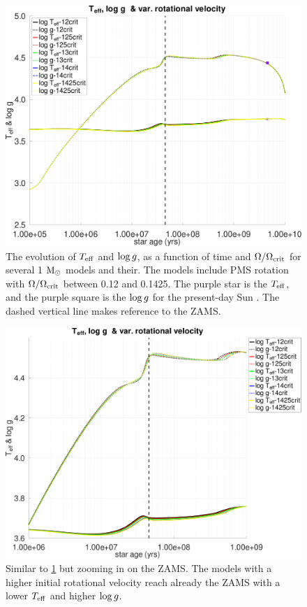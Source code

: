 \documentclass[fleqn,usenatbib]{mnras}
\begin{document}
\begin{ceqn}
\begin{figure}
	\includegraphics[clip,width=\columnwidth]{figures/paper2/teff_logg_var_vel_g3.pdf}
    \caption{The evolution of $T_{\mathrm{eff}}$ and $\mathrm{log} \, g$, as a function of time and $\Omega / \Omega_{\mathrm{crit}}$ for several 1 $\mathrm{M}_\odot$ models and their. The models include PMS rotation with $\Omega / \Omega_{\mathrm{crit}}$ between 0.12 and 0.1425. The purple star is the $T_{\mathrm{eff}}$, and the purple square is the $\mathrm{log} \, g$ for the present-day Sun \citep{Gill2012}. The dashed vertical line makes reference to the ZAMS.}
    \label{fig:teff_logg_var_vel_g3}
\end{figure}

\begin{figure}
	\includegraphics[clip,width=\columnwidth]{figures/paper2/teff_logg_var_vel_g_z13.pdf}
    \caption{Similar to \ref{fig:teff_logg_var_vel_g3} but zooming in on the ZAMS. The models with a higher initial rotational velocity reach already the ZAMS with a lower $T_{\mathrm{eff}}$ and higher $\mathrm{log} \, g$.}
    \label{fig:teff_logg_var_vel_g_z13}
\end{figure}



\end{ceqn}
\end{document}
